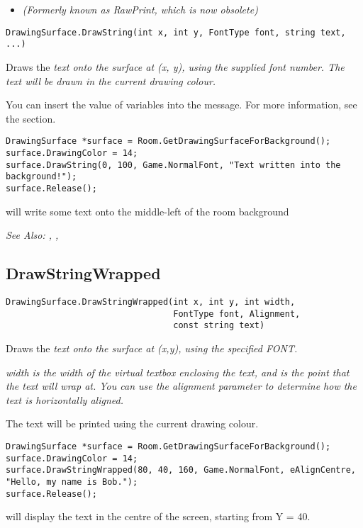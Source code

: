 \begin{itemize}
\item \it{(Formerly known as RawPrint, which is now obsolete)}
\end{itemize}

\begin{verbatim}
DrawingSurface.DrawString(int x, int y, FontType font, string text, ...)
\end{verbatim}
Draws the \it{text} onto the surface at (x, y), using the supplied font number.
The text will be drawn in the current drawing colour.

You can insert the value of variables into the message. For more information,
see the  section.

\begin{verbatim}
DrawingSurface *surface = Room.GetDrawingSurfaceForBackground();
surface.DrawingColor = 14;
surface.DrawString(0, 100, Game.NormalFont, "Text written into the background!");
surface.Release();
\end{verbatim}
will write some text onto the middle-left of the room background

\it{See Also:} ,
,


\subsection{DrawStringWrapped}\label{DrawingSurface.DrawStringWrapped}%

\begin{verbatim}
DrawingSurface.DrawStringWrapped(int x, int y, int width,
                                 FontType font, Alignment,
                                 const string text)
\end{verbatim}
Draws the \it{text} onto the surface at (x,y), using the specified FONT.

\it{width} is the width of the virtual textbox enclosing the text, and is the point
that the text will wrap at. You can use the \it{alignment} parameter to determine
how the text is horizontally aligned.

The text will be printed using the current drawing colour.

\begin{verbatim}
DrawingSurface *surface = Room.GetDrawingSurfaceForBackground();
surface.DrawingColor = 14;
surface.DrawStringWrapped(80, 40, 160, Game.NormalFont, eAlignCentre, "Hello, my name is Bob.");
surface.Release();
\end{verbatim}
will display the text in the centre of the screen, starting from Y = 40.

